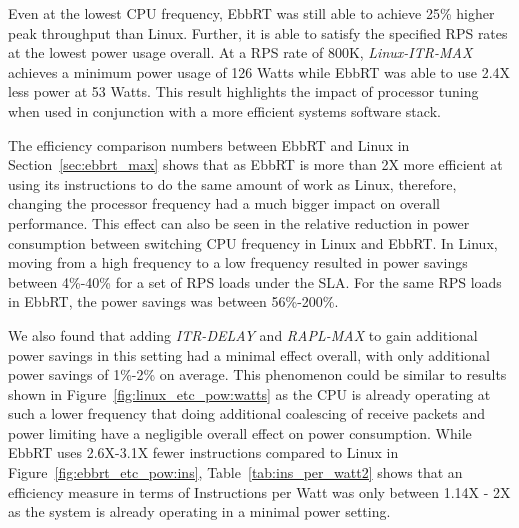 \documentclass[letterpaper,twocolumn,10pt]{article}
\begin{document}
Even at the lowest CPU frequency, EbbRT was still able to achieve 25\% higher peak throughput than Linux. Further, it is able to satisfy the specified RPS rates at the lowest power usage overall. At a RPS rate of 800K, \textit{Linux-ITR-MAX} achieves a minimum power usage of 126 Watts while EbbRT was able to use 2.4X less power at 53 Watts. This result highlights the impact of processor tuning when used in conjunction with a more efficient systems software stack. 

The efficiency comparison numbers between EbbRT and Linux in Section~\ref{sec:ebbrt_max} shows that as EbbRT is more than 2X more efficient at using its instructions to do the same amount of work as Linux, therefore, changing the processor frequency had a much bigger impact on overall performance. This effect can also be seen in the relative reduction in power consumption between switching CPU frequency in Linux and EbbRT. In Linux, moving from a high frequency to a low frequency resulted in power savings between 4\%-40\% for a set of RPS loads under the SLA. For the same RPS loads in EbbRT, the power savings was between 56\%-200\%.

We also found that adding \textit{ITR-DELAY} and \textit{RAPL-MAX} to gain additional power savings in this setting had a minimal effect overall, with only additional power savings of 1\%-2\% on average. This phenomenon could be similar to results shown in Figure~\ref{fig:linux_etc_pow:watts} as the CPU is already operating at such a lower frequency that doing additional coalescing of receive packets and power limiting have a negligible overall effect on power consumption. While EbbRT uses 2.6X-3.1X fewer instructions compared to Linux in Figure~\ref{fig:ebbrt_etc_pow:ins}, Table~\ref{tab:ins_per_watt2} shows that an efficiency measure in terms of Instructions per Watt was only between 1.14X - 2X as the system is already operating in a minimal power setting. 



\end{document}

